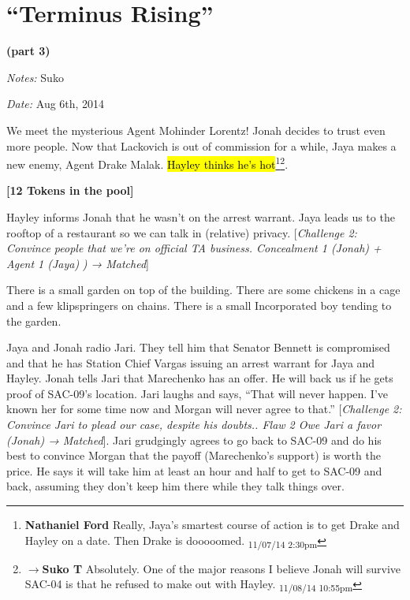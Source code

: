 \setcounter{chapter}{ 28 }
\chapter{\textbf{``Terminus Rising''} }




\begin{center}
 {\LARGE \textbf{(part 3)} } 
\end{center}




\textit{Notes:} Suko

\textit{Date:} Aug 6th, 2014



We meet the mysterious Agent Mohinder Lorentz!  Jonah decides to trust even more people.  Now that Lackovich is out of commission for a while, Jaya makes a new enemy, Agent Drake Malak. \hl{Hayley thinks he's hot}\footnote{\textbf{Nathaniel Ford }Really, Jaya's smartest course of action is to get Drake and Hayley on a date. Then Drake is dooooomed. \textsubscript{11/07/14 2:30pm}}\footnote{$\rightarrow$\textbf{Suko T }Absolutely.  One of the major reasons I believe Jonah will survive SAC-04 is that he refused to make out with Hayley. \textsubscript{11/08/14 10:55pm}}.



\noindent\hrulefill





\textbf{{[}12 Tokens in the pool{]}}



Hayley informs Jonah that he wasn't on the arrest warrant.  Jaya leads us to the rooftop of a restaurant so we can talk in (relative) privacy.  {[}\textit{Challenge 2: Convince people that we're on official TA business.  Concealment 1 (Jonah) + Agent 1 (Jaya) }\textit{) → Matched}{]}



There is a small garden on top of the building.  There are some chickens in a cage and a few klipspringers on chains.  There is a small Incorporated boy tending to the garden.



Jaya and Jonah radio Jari.  They tell him that Senator Bennett is compromised and that he has Station Chief Vargas issuing an arrest warrant for Jaya and Hayley.  Jonah tells Jari that Marechenko has an offer.  He will back us if he gets proof of SAC-09's location.  Jari laughs and says, ``That will never happen.  I've known her for some time now and Morgan will never agree to that.''   {[}\textit{Challenge 2: Convince Jari to plead our case, despite his doubts..  Flaw 2 Owe Jari a favor (Jonah) → Matched}{]}.  Jari grudgingly agrees to go back to SAC-09 and do his best to convince Morgan that the payoff (Marechenko's support) is worth the price.  He says it will take him at least an hour and half to get to SAC-09 and back, assuming they don't keep him there while they talk things over.




